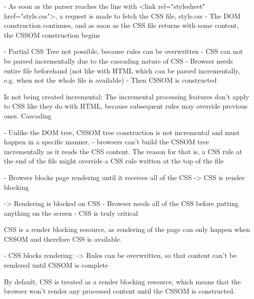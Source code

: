 - As soon as the parser reaches the line with <link rel="stylesheet" href="style.css">, a request is made to fetch the CSS file, style.css
- The DOM construction continues, and as soon as the CSS file returns with some content, the CSSOM construction begins




- Partial CSS Tree not possible, because rules can be overwritten
- CSS can not be parsed incrementally due to the cascading nature of CSS
- Browser needs entire file beforehand (not like with HTML which can be parsed incrementally, e.g. when not the whole file is available)
- Then CSSOM is constructed


Is not being created incremental: The incremental processing features don't apply to CSS like they do with HTML, because subsequent rules may override previous ones. Cascading

- Unlike the DOM tree, CSSOM tree construction is not incremental and must happen in a specific manner.
- browsers can’t build the CSSOM tree incrementally as it reads the CSS content. The reason for that is, a CSS rule at the end of the file might override a CSS rule written at the top of the file



- Browser blocks page rendering until it receives all of the CSS
-> CSS is render blocking
	
-> Rendering is blocked on CSS
- Browser needs all of the CSS before putting anything on the screen
- CSS is truly critical

CSS is a render blocking resource, as rendering of the page can only happen when CSSOM and therefore CSS is available. %

- CSS blocks rendering:
-> Rules can be overwritten, so that content can't be rendered until CSSOM is complete

By default, CSS is treated as a render blocking resource, which means that the browser won't render any processed content until the CSSOM is constructed.


